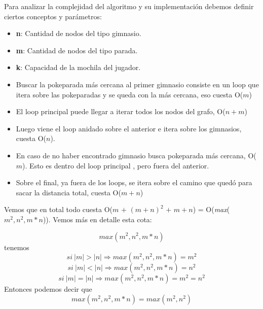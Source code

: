 \par Para analizar la complejidad del algoritmo y su implementación debemos definir ciertos conceptos y parámetros:

\begin{itemize}
	\item \textbf{n}: Cantidad de nodos del tipo gimnasio.
	\item \textbf{m}: Cantidad de nodos del tipo parada.
	\item \textbf{k}: Capacidad de la mochila del jugador.
\end{itemize}



\begin{itemize}
	\item Buscar la pokeparada más cercana al primer gimnasio consiste en un loop que itera sobre las pokeparadas y se queda con la más cercana, eso cuesta O($m$)
	\item El loop principal puede llegar a iterar todos los nodos del grafo, O($n + m$)
	\item Luego viene el loop anidado sobre el anterior e itera sobre los gimnasios, cuesta O($n$). 
	\item En caso de no haber encontrado gimnasio busca pokeparada más cercana, O($m$). Esto es dentro del loop principal , pero fuera del anterior.
	\item Sobre el final, ya fuera de los loops, se itera sobre el camino que quedó para sacar la distancia total, cuesta O($m + n$)
\end{itemize}

\par Vemos que en total todo cuesta O($m$ $+$ $(m+n)^2$ $+$ $m + n$) = O(\textit{max}($m^2, n^2, m*n$)). Vemos más en detalle esta cota:

\begin{equation}
	max(m^2, n^2, m*n)
\end{equation}
tenemos
\begin{equation}
	si\ |m| > |n| \Rightarrow max(m^2, n^2, m*n) = m^2
\end{equation}
\begin{equation}
	si\ |m| < |n| \Rightarrow max(m^2, n^2, m*n) = n^2
\end{equation}
\begin{equation}
	si\ |m| = |n| \Rightarrow max(m^2, n^2, m*n) = m^2 = n^2
\end{equation}
Entonces podemos decir que 
\begin{equation}
	max(m^2, n^2, m*n) = max(m^2, n^2)
\end{equation}

